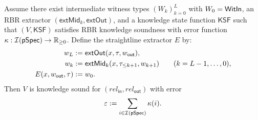 \begin{theorem}
\label{thm:rbr_ks_implies_ks_list}
Assume there exist intermediate witness types $(W_k)_{k=0}^L$ with $W_0=\mathsf{WitIn}$, an RBR extractor
$(\mathsf{extMid}_k,\mathsf{extOut})$, and a knowledge state function $\mathsf{KSF}$ such that $(V,
\mathsf{KSF})$ satisfies RBR knowledge soundness with error function
$\kappa:\mathcal{I}(\mathsf{pSpec})\to\mathbb{R}_{\ge 0}$. Define the straightline extractor $E$ by:
\begin{align*}
  w_L &\mathrel{:=} \mathsf{extOut}(x,\tau,w_{\mathsf{out}}),\\
  w_k &\mathrel{:=} \mathsf{extMid}_k(x,\tau_{\le k+1},w_{k+1}) \qquad (k=L-1,\dots,0),\\
  E(x,w_{\mathsf{out}},\tau) &\mathrel{:=} w_0.
\end{align*}
Then $V$ is knowledge sound for $(rel_{\mathsf{in}},rel_{\mathsf{out}})$ with error
\[
  \varepsilon \mathrel{:=} \sum_{i\in \mathcal{I}(\mathsf{pSpec})} \kappa(i).
\]
\end{theorem}

